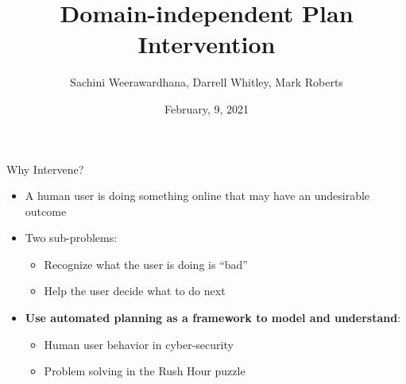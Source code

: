 \documentclass{beamer}
\title{Domain-independent Plan Intervention}
\author{Sachini Weerawardhana, Darrell Whitley, Mark Roberts}
\institute{AAAI/Plan, Activity and Intention Recognition (PAIR) Workshop}
\date{February, 9, 2021}
\begin{document}
\begin{frame}[plain]
 \titlepage
\end{frame}

\begin{frame}{Why Intervene?}
	\begin{itemize}
		\item A human user is doing something online that may have an undesirable outcome
		\item Two sub-problems:
		\begin{itemize}
		\item Recognize what the user is doing is ``bad''
		\item Help the user decide what to do next
		\end{itemize}
		\item \textbf{Use automated planning as a framework to model and understand}:
		\begin{itemize}
		\item Human user behavior in cyber-security
		\item Problem solving in the Rush Hour puzzle
		\end{itemize}
	\end{itemize}
\end{frame}
\end{document}
